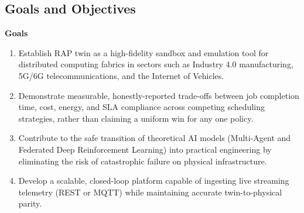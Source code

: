 \documentclass[12pt,a4]{report}
\begin{document}
\subsection{Goals and Objectives}

\textbf{Goals}
\begin{enumerate}
    \item Establish RAP twin as a high-fidelity sandbox and emulation tool for distributed computing fabrics in sectors such as Industry 4.0 manufacturing, 5G/6G telecommunications, and the Internet of Vehicles.
    \item Demonstrate measurable, honestly-reported trade-offs between job completion time, cost, energy, and SLA compliance across competing scheduling strategies, rather than claiming a uniform win for any one policy.
    \item Contribute to the safe transition of theoretical AI models (Multi-Agent and Federated Deep Reinforcement Learning) into practical engineering by eliminating the risk of catastrophic failure on physical infrastructure.
    \item Develop a scalable, closed-loop platform capable of ingesting live streaming telemetry (REST or MQTT) while maintaining accurate twin-to-physical parity.
\end{enumerate}
\end{document}

